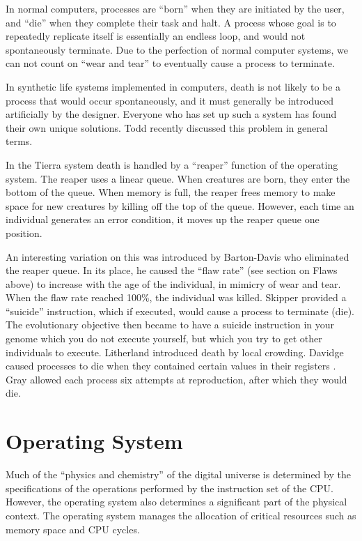 In normal computers, processes are ``born'' when they are initiated
by the user, and ``die'' when they complete their task and
halt.  A process whose goal is to repeatedly replicate itself is
essentially an endless loop, and would not spontaneously terminate.
Due to the perfection of normal computer systems, we can not count on
``wear and tear'' to eventually cause a process to terminate.

In synthetic life systems implemented in computers, death is not
likely to be a process that would occur spontaneously, and it must
generally be introduced artificially by the designer.  Everyone who
has set up such a system has found their own unique solutions.  Todd
\cite{Todd} recently discussed this problem in general terms.

In the Tierra system \cite{Ray91a} death is handled by a ``reaper''
function of the operating system.  The reaper uses a linear queue.
When creatures are born, they enter the bottom of the queue.  When
memory is full, the reaper frees memory to make space for new creatures
by killing off the top of the queue.  However, each time an individual
generates an error condition, it moves up the reaper queue one position.

An interesting variation on this was introduced by Barton-Davis \cite{BaDa}
who eliminated the reaper queue.  In its place, he caused the ``flaw
rate'' (see section on Flaws above) to increase with the age of the
individual, in mimicry of wear and tear.  When the flaw rate reached
100\%, the individual was killed.  Skipper \cite{Skip} provided a ``suicide''
instruction, which if executed, would cause a process to terminate (die).
The evolutionary objective then became to have a suicide instruction
in your genome which you do not execute yourself, but which you try
to get other individuals to execute.  Litherland \cite{Lith} introduced
death by local crowding.  Davidge caused processes to die when they
contained certain values in their registers \cite{Davi2}.  Gray
\cite{Gray} allowed each process six attempts at reproduction, after
which they would die.

\section{Operating System}

Much of the ``physics and chemistry'' of the digital universe is
determined by the specifications of the operations performed by the
instruction set of the CPU.  However, the operating system also
determines a significant part of the physical context.  The operating
system manages the allocation of critical resources such as memory
space and CPU cycles.

